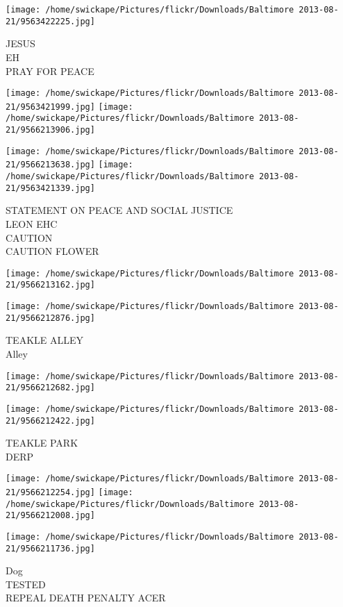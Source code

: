 \documentclass[10pt,letterpaper]{article}
\begin{document}
\vspace{0.25in}
\texttt{[image: /home/swickape/Pictures/flickr/Downloads/Baltimore 2013-08-21/9563422225.jpg]}

JESUS\\
EH\\
PRAY FOR PEACE
\pagebreak

\texttt{[image: /home/swickape/Pictures/flickr/Downloads/Baltimore 2013-08-21/9563421999.jpg]}
\texttt{[image: /home/swickape/Pictures/flickr/Downloads/Baltimore 2013-08-21/9566213906.jpg]}

\texttt{[image: /home/swickape/Pictures/flickr/Downloads/Baltimore 2013-08-21/9566213638.jpg]}
\texttt{[image: /home/swickape/Pictures/flickr/Downloads/Baltimore 2013-08-21/9563421339.jpg]}

STATEMENT ON PEACE AND SOCIAL JUSTICE\\
LEON EHC\\
CAUTION\\
CAUTION FLOWER
\pagebreak

\texttt{[image: /home/swickape/Pictures/flickr/Downloads/Baltimore 2013-08-21/9566213162.jpg]}

\vspace{0.25in}
\texttt{[image: /home/swickape/Pictures/flickr/Downloads/Baltimore 2013-08-21/9566212876.jpg]}

TEAKLE ALLEY\\
Alley
\pagebreak

\texttt{[image: /home/swickape/Pictures/flickr/Downloads/Baltimore 2013-08-21/9566212682.jpg]}

\vspace{0.25in}
\texttt{[image: /home/swickape/Pictures/flickr/Downloads/Baltimore 2013-08-21/9566212422.jpg]}

TEAKLE PARK\\
DERP
\pagebreak

\texttt{[image: /home/swickape/Pictures/flickr/Downloads/Baltimore 2013-08-21/9566212254.jpg]}
\texttt{[image: /home/swickape/Pictures/flickr/Downloads/Baltimore 2013-08-21/9566212008.jpg]}

\vspace{0.25in}
\texttt{[image: /home/swickape/Pictures/flickr/Downloads/Baltimore 2013-08-21/9566211736.jpg]}

Dog\\
TESTED\\
REPEAL DEATH PENALTY ACER
\pagebreak
\end{document}

